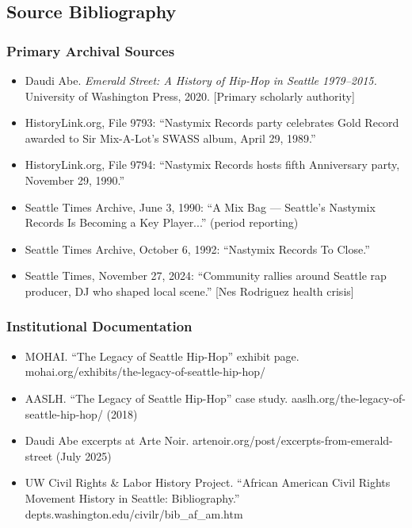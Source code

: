 \documentclass[11pt,letterpaper]{article}
\begin{document}
\subsection{Source Bibliography}

\subsubsection{Primary Archival Sources}
\begin{itemize}
\item Daudi Abe. \textit{Emerald Street: A History of Hip-Hop in Seattle 1979--2015.} University of Washington Press, 2020. [Primary scholarly authority]
\item HistoryLink.org, File 9793: ``Nastymix Records party celebrates Gold Record awarded to Sir Mix-A-Lot's SWASS album, April 29, 1989.''
\item HistoryLink.org, File 9794: ``Nastymix Records hosts fifth Anniversary party, November 29, 1990.''
\item Seattle Times Archive, June 3, 1990: ``A Mix Bag --- Seattle's Nastymix Records Is Becoming a Key Player...'' (period reporting)
\item Seattle Times Archive, October 6, 1992: ``Nastymix Records To Close.''
\item Seattle Times, November 27, 2024: ``Community rallies around Seattle rap producer, DJ who shaped local scene.'' [Nes Rodriguez health crisis]
\end{itemize}

\subsubsection{Institutional Documentation}
\begin{itemize}
\item MOHAI. ``The Legacy of Seattle Hip-Hop'' exhibit page. mohai.org/exhibits/the-legacy-of-seattle-hip-hop/
\item AASLH. ``The Legacy of Seattle Hip-Hop'' case study. aaslh.org/the-legacy-of-seattle-hip-hop/ (2018)
\item Daudi Abe excerpts at Arte Noir. artenoir.org/post/excerpts-from-emerald-street (July 2025)
\item UW Civil Rights \& Labor History Project. ``African American Civil Rights Movement History in Seattle: Bibliography.'' depts.washington.edu/civilr/bib\_af\_am.htm
\end{itemize}
\end{document}
